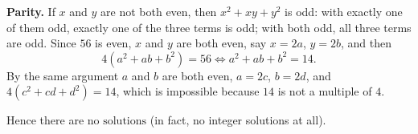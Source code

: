 \textbf{Parity.} If $x$ and $y$ are not both even, then $x^2+xy+y^2$ is odd: with exactly one of them odd, exactly one of the three terms is odd; with both odd, all three terms are odd. Since $56$ is even, $x$ and $y$ are both even, say $x=2a$, $y=2b$, and then
\[4\left(a^2+ab+b^2\right)=56\iff a^2+ab+b^2=14.\]
By the same argument $a$ and $b$ are both even, $a=2c$, $b=2d$, and $4\left(c^2+cd+d^2\right)=14$, which is impossible because $14$ is not a multiple of $4$.

Hence there are $\boxed{\text{no solutions}}$ (in fact, no integer solutions at all).
